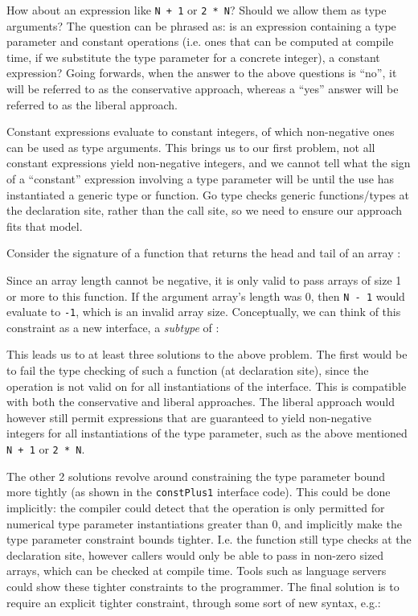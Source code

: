 How about an expression like \texttt{N + 1} or \texttt{2 * N}? Should we allow
them as  type arguments? The question can be phrased as: is an
expression containing a  type parameter and constant operations (i.e.
ones that can be computed at compile time, if we substitute the type parameter
for a concrete integer), a constant expression? Going forwards, when the answer
to the above questions is ``no'', it will be referred to as the conservative
approach, whereas a ``yes'' answer will be referred to as the liberal approach.

Constant expressions evaluate to constant integers, of which non-negative ones
can be used as  type arguments. This brings us to our first problem,
not all constant expressions yield non-negative integers, and we cannot tell
what the sign of a ``constant'' expression involving a type parameter will be
until the use has instantiated a generic type or function. Go type checks
generic functions/types at the declaration site, rather than the call site, so
we need to ensure our approach fits that model.

Consider the signature of a function that returns the head and tail of an array
\autocite{rustConstBlog}:


Since an array length cannot be negative, it is only valid to pass arrays of
size 1 or more to this function. If the argument array's length was 0, then
\texttt{N - 1} would evaluate to \texttt{-1}, which is an invalid array size.
Conceptually, we can think of this constraint as a new interface, a
\emph{subtype} of :


This leads us to at least three solutions to the above problem. The first would
be to fail the type checking of such a function (at declaration site), since the
operation is not valid on for all instantiations of the  interface.
This is compatible with both the conservative and liberal approaches. The
liberal approach would however still permit expressions that are guaranteed to
yield non-negative integers for all instantiations of the type parameter, such
as the above mentioned \texttt{N + 1} or \texttt{2 * N}.

The other 2 solutions revolve around constraining the type parameter bound more
tightly (as shown in the \texttt{constPlus1} interface code). This could be done
implicitly: the compiler could detect that the operation is only permitted for
numerical type parameter instantiations greater than 0, and implicitly make the
type parameter constraint bounds tighter. I.e. the function still type checks at
the declaration site, however callers would only be able to pass in non-zero
sized arrays, which can be checked at compile time. Tools such as language
servers could show these tighter constraints to the programmer. The final
solution is to require an explicit tighter constraint, through some sort of new
syntax, e.g.:

